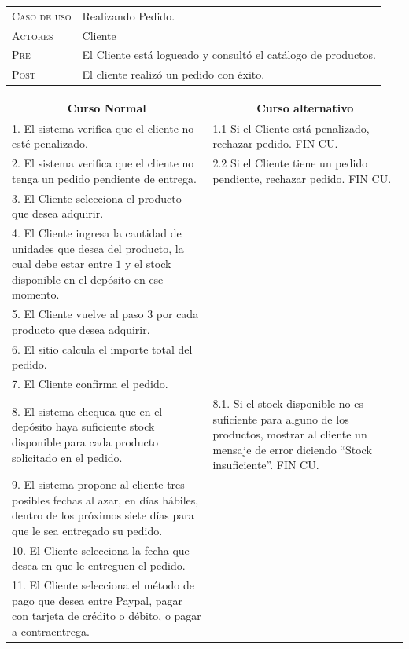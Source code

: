 \newpage

\begin{tabular}{p{} p{}}
    \textsc{Caso de uso} & Realizando Pedido. \\
    \textsc{Actores} & Cliente \\
    \textsc{Pre} & El Cliente está logueado y consultó el catálogo de
    productos. \\
    \textsc{Post} & El cliente realizó un pedido con éxito. \\
\end{tabular}


\begin{center}
\begin{tabular}{|p{}|p{}|}
    \hline
    \multicolumn{1}{|c|}{Curso Normal} &
    \multicolumn{1}{|c|}{Curso alternativo} \\
    \hline
    1. El sistema verifica que el cliente no esté penalizado. &
    1.1 Si el Cliente está penalizado, rechazar pedido. FIN CU. \\
    2. El sistema verifica que el cliente no tenga un pedido pendiente de entrega. &
    2.2 Si el Cliente tiene un pedido pendiente, rechazar pedido. FIN CU. \\
    3. El Cliente selecciona el producto que desea adquirir. & \\
    4. El Cliente ingresa la cantidad de unidades que desea del producto, la cual debe estar entre $1$ y el stock disponible en el depósito en ese momento. & \\
    5. El Cliente vuelve al paso 3 por cada producto que desea adquirir. & \\
    6. El sitio calcula el importe total del pedido. & \\
    7. El Cliente confirma el pedido. & \\
    8. El sistema chequea que en el depósito haya suficiente stock disponible para cada producto solicitado en el pedido. &
    8.1. Si el stock disponible no es suficiente para alguno de los productos, mostrar al cliente un mensaje de error diciendo ``Stock insuficiente''. FIN CU. \\
    9. El sistema propone al cliente tres posibles fechas al azar, en días hábiles, dentro de los próximos siete días para que le sea entregado su pedido. & \\
    10. El Cliente selecciona la fecha que desea en que le entreguen el pedido. & \\
    11. El Cliente selecciona el método de pago que desea entre Paypal, pagar con tarjeta de crédito o débito, o pagar a contraentrega. & \\

\end{tabular}
\end{center}

